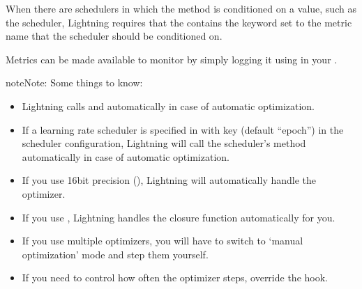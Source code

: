\documentclass[letterpaper,10pt,english]{sphinxmanual}
\begin{document}
\begin{fulllineitems}
\begin{fulllineitems}
\sphinxAtStartPar
When there are schedulers in which the  method is conditioned on a value, such as the
 scheduler, Lightning requires that the
 contains the keyword  set to the metric name that the scheduler
should be conditioned on.

\sphinxAtStartPar
Metrics can be made available to monitor by simply logging it using
 in your .

\begin{sphinxadmonition}{note}{Note:}
\sphinxAtStartPar
Some things to know:
\begin{itemize}
\item {} 
\sphinxAtStartPar
Lightning calls  and  automatically in case of automatic optimization.

\item {} 
\sphinxAtStartPar
If a learning rate scheduler is specified in  with key
 (default “epoch”) in the scheduler configuration, Lightning will call
the scheduler’s  method automatically in case of automatic optimization.

\item {} 
\sphinxAtStartPar
If you use 16\sphinxhyphen{}bit precision (), Lightning will automatically handle the optimizer.

\item {} 
\sphinxAtStartPar
If you use , Lightning handles the closure function automatically for you.

\item {} 
\sphinxAtStartPar
If you use multiple optimizers, you will have to switch to ‘manual optimization’ mode and step them
yourself.

\item {} 
\sphinxAtStartPar
If you need to control how often the optimizer steps, override the  hook.

\end{itemize}
\end{sphinxadmonition}


\end{fulllineitems}
\end{fulllineitems}
\end{document}
